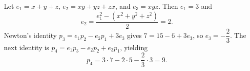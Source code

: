Let $e_1=x+y+z$, $e_2=xy+yz+zx$, and $e_3=xyz$. Then $e_1=3$ and
\[
e_2=\dfrac{e_1^2-(x^2+y^2+z^2)}{2}=2.
\]
Newton's identity $p_3=e_1p_2-e_2p_1+3e_3$ gives $7=15-6+3e_3$, so $e_3=-\dfrac{2}{3}$.
The next identity is $p_4=e_1p_3-e_2p_2+e_3p_1$, yielding
\[
p_4=3\cdot7-2\cdot5-\dfrac{2}{3}\cdot3=\boxed9.
\]

